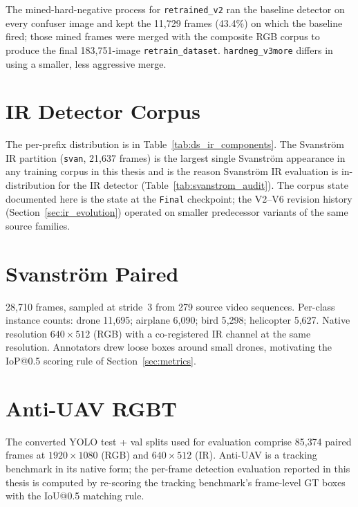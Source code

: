 \noindent The mined-hard-negative process for \texttt{retrained\_v2} ran the baseline detector on every confuser image and kept the 11{,}729 frames (43.4\%) on which the baseline fired; those mined frames were merged with the composite RGB corpus to produce the final 183{,}751-image \texttt{retrain\_dataset}. \texttt{hardneg\_v3more} differs in using a smaller, less aggressive merge.

\section{IR Detector Corpus}

The per-prefix distribution is in Table~\ref{tab:ds_ir_components}. The Svanstr\"om IR partition (\texttt{svan}, 21{,}637 frames) is the largest single Svanstr\"om appearance in any training corpus in this thesis and is the reason Svanstr\"om IR evaluation is in-distribution for the IR detector (Table~\ref{tab:svanstrom_audit}). The corpus state documented here is the state at the \texttt{Final} checkpoint; the V2--V6 revision history (Section~\ref{sec:ir_evolution}) operated on smaller predecessor variants of the same source families.

\section{Svanstr\"om Paired}

28{,}710 frames, sampled at stride~3 from 279 source video sequences. Per-class instance counts: drone 11{,}695; airplane 6{,}090; bird 5{,}298; helicopter 5{,}627. Native resolution $640{\times}512$ (RGB) with a co-registered IR channel at the same resolution. Annotators drew loose boxes around small drones, motivating the IoP@0.5 scoring rule of Section~\ref{sec:metrics}.

\section{Anti-UAV RGBT}

The converted YOLO test + val splits used for evaluation comprise 85{,}374 paired frames at $1920{\times}1080$ (RGB) and $640{\times}512$ (IR). Anti-UAV is a tracking benchmark in its native form; the per-frame detection evaluation reported in this thesis is computed by re-scoring the tracking benchmark's frame-level GT boxes with the IoU@0.5 matching rule.

